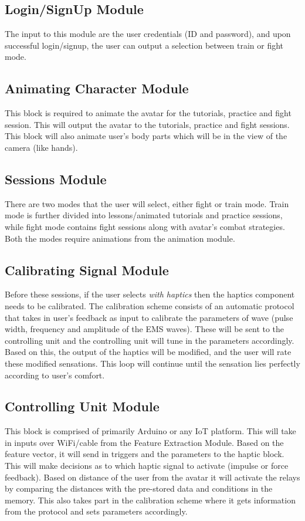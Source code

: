 \subsection{Login/SignUp Module}
The input to this module are the user credentials (ID and password), and upon successful login/signup, the user can output a selection between train or fight mode.
\subsection{Animating Character Module}
This block is required to animate the avatar for the tutorials, practice and fight session. This will output the avatar to the tutorials, practice and fight sessions. This block will also animate user's body parts which will be in the view of the camera (like hands). 
\subsection{Sessions Module}
There are two modes that the user will select, either fight or train mode. Train mode is further divided into lessons/animated tutorials and practice sessions, while fight mode contains fight sessions along with avatar's combat strategies. Both the modes require animations from the animation module. 
\subsection{Calibrating Signal Module}
Before these sessions, if the user selects \textit{with haptics} then the haptics component needs to be calibrated. The calibration scheme consists of an automatic protocol that takes in user’s feedback as input to calibrate the parameters of wave (pulse width, frequency and amplitude of the EMS waves). These will be sent to the controlling unit and the controlling unit will tune in the parameters accordingly. Based on this, the output of the haptics will be modified, and the user will rate these modified sensations. This loop will continue until the sensation lies perfectly according to user's comfort. 
\subsection{Controlling Unit Module}
This block is comprised of primarily Arduino or any IoT platform. This will take in inputs over WiFi/cable from the Feature Extraction Module. Based on the feature vector, it will send in triggers and the parameters to the haptic block. This will make decisions as to which haptic signal to activate (impulse or force feedback). Based on distance of the user from the avatar it will activate the relays by comparing the distances with the pre-stored data and conditions in the memory. This also takes part in the calibration scheme where it gets information from the protocol and sets parameters accordingly.
